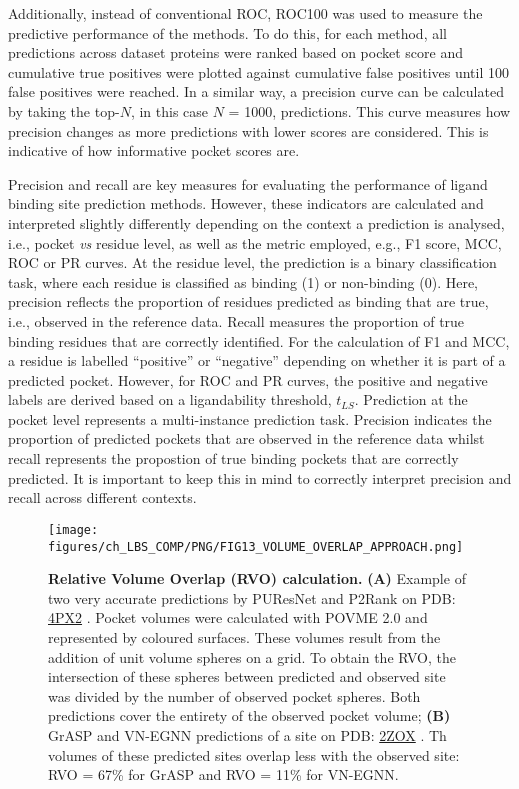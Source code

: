 Additionally, instead of conventional ROC, ROC100 \cite{WEBBER_2003_ROC100, SCOTT_2007_ROC100} was used to measure the predictive performance of the methods. To do this, for each method, all predictions across dataset proteins were ranked based on pocket score and cumulative true positives were plotted against cumulative false positives until 100 false positives were reached. In a similar way, a precision curve can be calculated by taking the top-$N$, in this case $N$ = 1000, predictions. This curve measures how precision changes as more predictions with lower scores are considered. This is indicative of how informative pocket scores are.

Precision and recall are key measures for evaluating the performance of ligand binding site prediction methods. However, these indicators are calculated and interpreted slightly differently depending on the context a prediction is analysed, i.e., pocket \textit{vs} residue level, as well as the metric employed, e.g., F1 score, MCC, ROC or PR curves. At the residue level, the prediction is a binary classification task, where each residue is classified as binding (1) or non-binding (0). Here, precision reflects the proportion of residues predicted as binding that are true, i.e., observed in the reference data. Recall measures the proportion of true binding residues that are correctly identified. For the calculation of F1 and MCC, a residue is labelled ``positive'' or ``negative'' depending on whether it is part of a predicted pocket. However, for ROC and PR curves, the positive and negative labels are derived based on a ligandability threshold, $t_{LS}$. Prediction at the pocket level represents a multi-instance prediction task. Precision indicates the proportion of predicted pockets that are observed in the reference data whilst recall represents the propostion of true binding pockets that are correctly predicted. It is important to  keep this in mind to correctly interpret precision and recall across different contexts.

\begin{figure}[htbp!]
    \centering
    \texttt{[image: figures/ch\_LBS\_COMP/PNG/FIG13\_VOLUME\_OVERLAP\_APPROACH.png]}
    \caption[Relative Volume Overlap (RVO) calculation]{\textbf{Relative Volume Overlap (RVO) calculation.} \textbf{(A)} Example of two very accurate predictions by PUResNet and P2Rank on PDB: \href{https://www.ebi.ac.uk/pdbe/entry/pdb/4px2}{4PX2} \cite{PDB_4PX2}. Pocket volumes were calculated with POVME 2.0 and represented by coloured surfaces. These volumes result from the addition of unit volume spheres on a grid. To obtain the RVO, the intersection of these spheres between predicted and observed site was divided by the number of observed pocket spheres. Both predictions cover the entirety of the observed pocket volume; \textbf{(B)} GrASP and VN-EGNN predictions of a site on PDB: \href{https://www.ebi.ac.uk/pdbe/entry/pdb/2ZOX}{2ZOX} \cite{NOGUCHI_2008_STRUCTURE}. Th volumes of these predicted sites overlap less with the observed site: RVO = 67\% for GrASP and RVO = 11\% for VN-EGNN.}
    \label{fig:protein_RVO_approach}
\end{figure}

